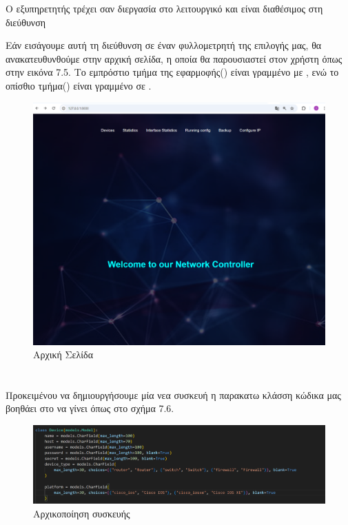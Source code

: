 Ο εξυπηρετητής τρέχει σαν διεργασία στο λειτουργικό
και είναι διαθέσιμος στη διεύθυνση 

Εάν εισάγουμε αυτή τη διεύθυνση σε έναν 
φυλλομετρητή της επιλογής μας, θα ανακατευθυνθούμε 
στην αρχική σελίδα, η οποία θα παρουσιαστεί στον 
χρήστη όπως στην εικόνα 7.5. Το εμπρόστιο τμήμα της εφαρμοφής() 
είναι γραμμένο με , ενώ το οπίσθιο τμήμα() 
είναι γραμμένο σε .

\FloatBarrier
\begin{figure}[h]
	\centering
	\includegraphics[width=1.2\textwidth]{graphics/home_page.png}
	\caption{ Αρχική Σελίδα}
\end{figure}

\FloatBarrier %

\section{}

Προκειμένου να δημιουργήσουμε μία νεα συσκευή η παρακατω κλάσση
κώδικα μας βοηθάει στο να γίνει όπως στο σχήμα 7.6.

\FloatBarrier
\begin{figure}[htb]
	\centering
	\includegraphics[width=1.2\textwidth]{graphics/class_device.png}
	\caption{Αρχικοποίηση συσκευής}
\end{figure}

